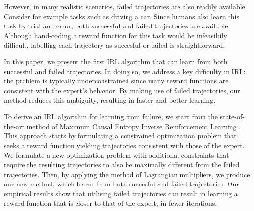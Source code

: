 \documentclass[conference]{IEEEtran}
\begin{document}
However, in many realistic scenarios, failed trajectories are also readily available.  Consider for example tasks such as driving a car.  Since humans also learn this task by trial and error, both successful and failed trajectories are available.  Although hand-coding a reward function for this task would be infeasibily difficult, labelling each trajectory as succesful or failed is straightforward.  

In this paper, we present the first IRL algorithm that can learn from both successful and failed trajectories.  In doing so, we address a key difficulty in IRL: the problem is typically underconstrained since many reward functions are consistent with the expert's behavior.  By making use of failed trajectories, our method reduces this ambiguity, resulting in faster and better learning.

To derive an IRL algorithm for learning from failure, we start from the state-of-the-art method of Maximum Causal Entropy Inverse Reinforcement Learning \cite{ziebart2008maximum}.  This approach starts by formulating a constrained optimization problem that seeks a reward function yielding trajectories consistent with those of the expert.  We formulate a new optimization problem with additional constraints that require the resulting trajectories to also be maximally different from the failed trajectories.  Then, by applying the method of Lagrangian multipliers, we produce our new method, which learns from both succesful and failed trajectories.
	Our empirical results show that utilising failed trajectories can result in learning  a reward function that is closer to that of the expert, in fewer iterations.



\end{document}
